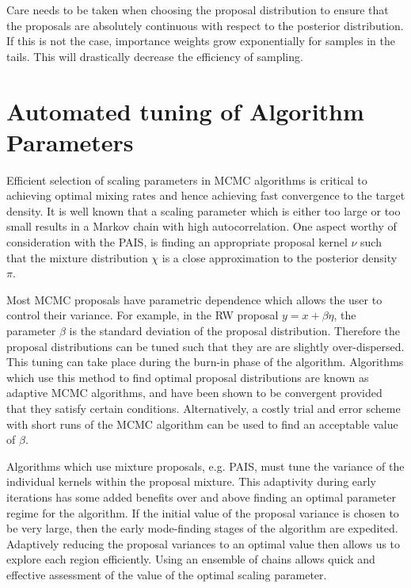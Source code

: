 \documentclass[final]{siamltex}
\begin{document}
Care needs to be taken when choosing the proposal distribution to
ensure that the proposals are absolutely continuous with respect to
the posterior distribution. If this is not the case, importance
weights grow exponentially for samples in the tails. This will
drastically decrease the efficiency of sampling.


\section{Automated tuning of Algorithm Parameters}\label{Sec:adapt}

Efficient selection of scaling parameters in MCMC algorithms is
critical to achieving optimal mixing rates and hence achieving fast
convergence to the target density. It is well known that a scaling
parameter which is either too large or too small results in a Markov
chain with high autocorrelation. One aspect worthy of consideration
with the PAIS, is finding an appropriate proposal kernel $\nu$ such
that the mixture distribution $\chi$ is a close approximation to the
posterior density $\pi$.

Most MCMC proposals have parametric dependence which
allows the user to control their variance. For example, in the RW
proposal $y = x + \beta \eta$, the parameter $\beta$ is the standard deviation
of the proposal distribution. Therefore the proposal distributions can
be tuned such that they are are slightly over-dispersed. This tuning
can take place during the burn-in phase of the algorithm. Algorithms
which use this method to find optimal proposal distributions are known
as adaptive MCMC algorithms, and have been shown to be convergent
provided that they satisfy certain
conditions\cite{roberts2007coupling,roberts2009examples}.
Alternatively, a costly trial and error scheme with short runs of the
MCMC algorithm can be used to find an acceptable value of $\beta$.

Algorithms which use mixture proposals, e.g. PAIS, must tune the
variance of the individual kernels within the proposal mixture. This
adaptivity during early iterations has some added benefits over and above
finding an optimal parameter regime for the algorithm. If the initial
value of the proposal variance is chosen to be very large, then the early
mode-finding stages of the algorithm are expedited. Adaptively
reducing the proposal variances to an optimal value then allows us to
explore each region efficiently. Using an ensemble of chains allows
quick and effective assessment of the value of the optimal scaling
parameter.
\end{document}
